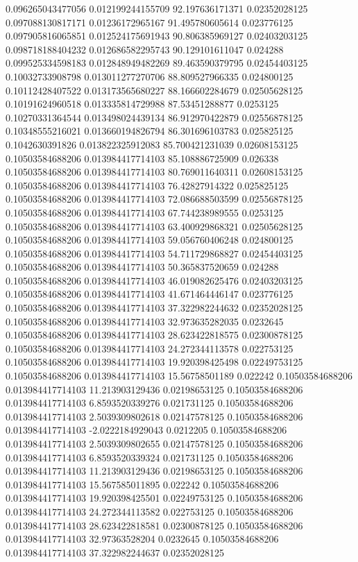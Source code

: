 0.096265043477056 0.012199244155709 92.197636171371 0.02352028125
0.097088130817171 0.01236172965167 91.495780605614 0.023776125
0.097905816065851 0.012524175691943 90.806385969127 0.02403203125
0.098718188404232 0.012686582295743 90.129101611047 0.024288
0.099525334598183 0.012848949482269 89.463590379795 0.02454403125
0.10032733908798 0.013011277270706 88.809527966335 0.024800125
0.10112428407522 0.013173565680227 88.166602284679 0.02505628125
0.10191624960518 0.013335814729988 87.53451288877 0.0253125
0.10270331364544 0.013498024439134 86.912970422879 0.02556878125
0.10348555216021 0.013660194826794 86.301696103783 0.025825125
0.1042630391826 0.013822325912083 85.700421231039 0.02608153125
0.10503584688206 0.013984417714103 85.108886725909 0.026338
0.10503584688206 0.013984417714103 80.769011640311 0.02608153125
0.10503584688206 0.013984417714103 76.42827914322 0.025825125
0.10503584688206 0.013984417714103 72.086688503599 0.02556878125
0.10503584688206 0.013984417714103 67.744238989555 0.0253125
0.10503584688206 0.013984417714103 63.400929868321 0.02505628125
0.10503584688206 0.013984417714103 59.056760406248 0.024800125
0.10503584688206 0.013984417714103 54.711729868827 0.02454403125
0.10503584688206 0.013984417714103 50.365837520659 0.024288
0.10503584688206 0.013984417714103 46.019082625476 0.02403203125
0.10503584688206 0.013984417714103 41.671464446147 0.023776125
0.10503584688206 0.013984417714103 37.322982244632 0.02352028125
0.10503584688206 0.013984417714103 32.973635282035 0.0232645
0.10503584688206 0.013984417714103 28.623422818575 0.02300878125
0.10503584688206 0.013984417714103 24.272344113578 0.022753125
0.10503584688206 0.013984417714103 19.920398425498 0.02249753125
0.10503584688206 0.013984417714103 15.56758501189 0.022242
0.10503584688206 0.013984417714103 11.213903129436 0.02198653125
0.10503584688206 0.013984417714103 6.8593520339276 0.021731125
0.10503584688206 0.013984417714103 2.5039309802618 0.02147578125
0.10503584688206 0.013984417714103 -2.0222184929043 0.0212205
0.10503584688206 0.013984417714103 2.5039309802655 0.02147578125
0.10503584688206 0.013984417714103 6.8593520339324 0.021731125
0.10503584688206 0.013984417714103 11.213903129436 0.02198653125
0.10503584688206 0.013984417714103 15.567585011895 0.022242
0.10503584688206 0.013984417714103 19.920398425501 0.02249753125
0.10503584688206 0.013984417714103 24.272344113582 0.022753125
0.10503584688206 0.013984417714103 28.623422818581 0.02300878125
0.10503584688206 0.013984417714103 32.97363528204 0.0232645
0.10503584688206 0.013984417714103 37.322982244637 0.02352028125
